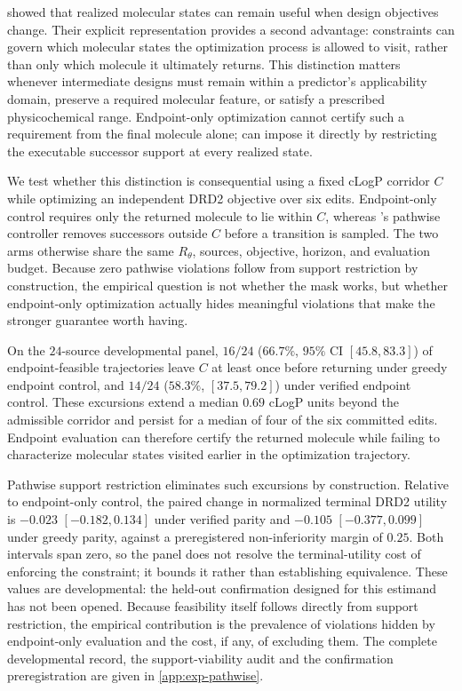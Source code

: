 showed that realized molecular states can remain useful when design objectives change. Their explicit representation provides a second advantage: constraints can govern which molecular states the optimization process is allowed to visit, rather than only which molecule it ultimately returns. This distinction matters whenever intermediate designs must remain within a predictor's applicability domain, preserve a required molecular feature, or satisfy a prescribed physicochemical range. Endpoint-only optimization cannot certify such a requirement from the final molecule alone; \method{} can impose it directly by restricting the executable successor support at every realized state.

We test whether this distinction is consequential using a fixed cLogP corridor $C$ while optimizing an independent DRD2 objective over six edits. Endpoint-only control requires only the returned molecule to lie within $C$, whereas \method{}'s pathwise controller removes successors outside $C$ before a transition is sampled. The two arms otherwise share the same $R_\theta$, sources, objective, horizon, and evaluation budget. Because zero pathwise violations follow from support restriction by construction, the empirical question is not whether the mask works, but whether endpoint-only optimization actually hides meaningful violations that make the stronger guarantee worth having.

On the $24$-source developmental panel, $16/24$ ($66.7\%$, $95\%$ CI $[45.8,83.3]$) of endpoint-feasible trajectories leave $C$ at least once before returning under greedy endpoint control, and $14/24$ ($58.3\%$, $[37.5,79.2]$) under verified endpoint control. These excursions extend a median $0.69$ cLogP units beyond the admissible corridor and persist for a median of four of the six committed edits. Endpoint evaluation can therefore certify the returned molecule while failing to characterize molecular states visited earlier in the optimization trajectory.

Pathwise support restriction eliminates such excursions by construction. Relative to endpoint-only control, the paired change in normalized terminal DRD2 utility is $-0.023$ $[-0.182,0.134]$ under verified parity and $-0.105$ $[-0.377,0.099]$ under greedy parity, against a preregistered non-inferiority margin of $0.25$. Both intervals span zero, so the panel does not resolve the terminal-utility cost of enforcing the constraint; it bounds it rather than establishing equivalence. These values are developmental: the held-out confirmation designed for this estimand has not been opened. Because feasibility itself follows directly from support restriction, the empirical contribution is the prevalence of violations hidden by endpoint-only evaluation and the cost, if any, of excluding them. The complete developmental record, the support-viability audit and the confirmation preregistration are given in \cref{app:exp-pathwise}.

